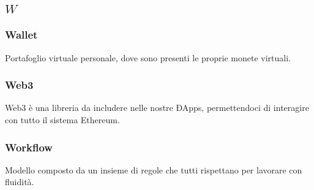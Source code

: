 \subsection*{\quad$W\quad$}
\subsubsection*{Wallet}
Portafoglio virtuale personale, dove sono presenti le proprie monete virtuali.

\subsubsection*{Web3}
Web3 è una libreria da includere nelle nostre ÐApps\glo, permettendoci di interagire con tutto il sistema Ethereum\glo.

\subsubsection*{Workflow}
Modello composto da un insieme di regole che tutti rispettano per lavorare con fluidità.

